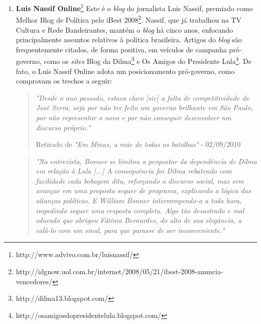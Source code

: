 
\begin{enumerate}

\item \textbf{Luis Nassif Online}\footnote{http://www.advivo.com.br/luisnassif/} Este é o \emph{blog} do jornalista Luis Nassif, premiado como Melhor Blog de Política pelo iBest 2008\footnote{http://idgnow.uol.com.br/internet/2008/05/21/ibest-2008-anuncia-vencedores/}. Nassif, que já trabalhou na TV Cultura e Rede Bandeirantes, mantém o \emph{blog} há cinco anos, enfocando principalmente assuntos relativos à política brasileira. Artigos do \emph{blog} são frequentemente citados, de forma positiva, em veículos de campanha pró-governo, como os \emph{sites} Blog da Dilma\footnote{http://dilma13.blogspot.com/} e Os Amigos do Presidente Lula\footnote{http://osamigosdopresidentelula.blogspot.com/}. De fato, o Luis Nassif Online adota um posicionamento pró-governo, como comprovam os trechos a seguir:

\begin{quote}
\emph{"Desde o ano passado, estava claro [sic] a falta de competitividade de José Serra, seja por não ter feito um governo brilhante em São Paulo, por não representar o novo e por não conseguir desenvolver um discurso próprio."}

{\small Retirado de \emph{"Em Minas, a mãe de todas as batalhas"} - 02/09/2010} 
\end{quote}

\begin{quote}

\emph{"Na entrevista, Bonner se limitou a perguntar da dependência de Dilma em relação à Lula [...] A consequência foi Dilma rebatendo com facilidade cada bobagem dita, reforçando o discurso social, mas sem avançar em uma proposta sequer de programa, explicando a lógica das alianças políticas. E William Bonner interrompendo-a a toda hora, impedindo sequer uma resposta completa. Algo tão desastrado e mal educado que obrigou Fátima Bernardes, do alto de sua elegância, a calá-lo com um sinal, para que parasse de ser inconveniente."}


\end{quote}
\end{enumerate}
